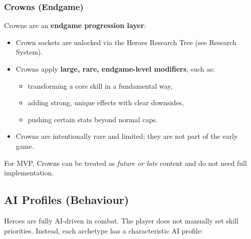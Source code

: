 
\subsubsection{Crowns (Endgame)}

Crowns are an \textbf{endgame progression layer}:

\begin{itemize}
	\item Crown sockets are unlocked via the Heroes Research Tree (see Research System).
	\item Crowns apply \textbf{large, rare, endgame-level modifiers}, such as:
	\begin{itemize}
		\item transforming a core skill in a fundamental way,
		\item adding strong, unique effects with clear downsides,
		\item pushing certain stats beyond normal caps.
	\end{itemize}
	\item Crowns are intentionally rare and limited; they are not part of the early game.
\end{itemize}

For MVP, Crowns can be treated as \emph{future or late} content and do not need full implementation.


\subsection{AI Profiles (Behaviour)}

Heroes are fully AI-driven in combat. The player does not manually set skill priorities. 
Instead, each archetype has a characteristic AI profile:

